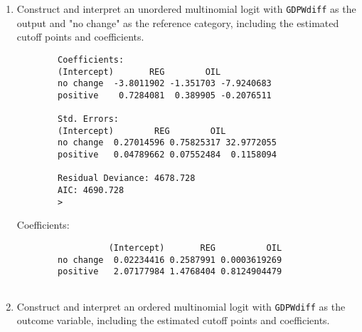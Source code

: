 \documentclass[12pt,letterpaper]{article}
\begin{document}
	\begin{enumerate}
		\item Construct and interpret an unordered multinomial logit with \texttt{GDPWdiff} as the output and "no change" as the reference category, including the estimated cutoff points and coefficients.
		
	\begin{verbatim}
		Coefficients:
		(Intercept)       REG        OIL
		no change  -3.8011902 -1.351703 -7.9240683
		positive    0.7284081  0.389905 -0.2076511
		
		Std. Errors:
		(Intercept)        REG        OIL
		no change  0.27014596 0.75825317 32.9772055
		positive   0.04789662 0.07552484  0.1158094
		
		Residual Deviance: 4678.728 
		AIC: 4690.728 
		> 
		\end{verbatim}
	
		Coefficients:
	\begin{verbatim}	
		          (Intercept)       REG          OIL
		no change  0.02234416 0.2587991 0.0003619269
		positive   2.07177984 1.4768404 0.8124904479
		
	\end{verbatim}	
		\item Construct and interpret an ordered multinomial logit with \texttt{GDPWdiff} as the outcome variable, including the estimated cutoff points and coefficients.

		
	\end{enumerate}
	
	
\end{document}
